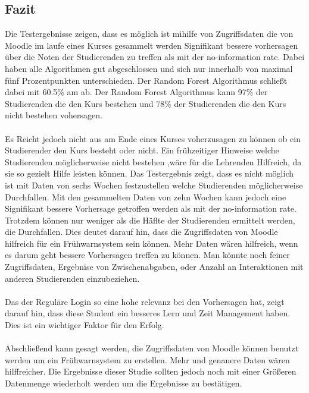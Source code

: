 \subsection{Fazit}
Die Testergebnisse zeigen, dass es möglich ist mihilfe von Zugriffsdaten die von Moodle im laufe eines Kurses gesammelt werden Signifikant bessere vorhersagen über die Noten der Studierenden zu treffen als mit der \glqq no-information rate\grqq{}.
Dabei haben alle Algorithmen gut abgeschlossen und sich nur innerhalb von maximal fünf Prozentpunkten unterschieden. Der Random Forest Algorithmus schließt dabei mit 60.5\% am ab.
Der Random Forest Algorithmus kann 97\% der Studierenden die den Kurs bestehen und 78\% der Studierenden die den Kurs nicht bestehen vohersagen.
\\ \noindent \\ \noindent
Es Reicht jedoch nicht aus am Ende eines Kurses voherzusagen zu können ob ein Studierender den Kurs besteht oder nicht.
Ein frühzeitiger Hinweise welche Studierenden möglicherweise nicht bestehen ,wäre für die Lehrenden Hilfreich, da sie so gezielt Hilfe leisten können.
Das Testergebnis zeigt, dass es nicht möglich ist mit Daten von sechs Wochen festzustellen welche Studierenden möglicherweise Durchfallen. 
Mit den gesammelten Daten von zehn Wochen kann jedoch eine Signifikant bessere Vorhersage getroffen werden als mit der \glqq no-information rate\grqq{}.
Trotzdem können nur weniger als die Häflte der Studierenden ermittelt werden, die Durchfallen. Dies deutet darauf hin, dass die Zugriffsdaten von Moodle hilfreich für ein Frühwarnsystem sein können.
Mehr Daten wären hilfreich, wenn es darum geht bessere Vorhersagen treffen zu können. Man könnte noch feiner Zugriffsdaten, Ergebnise von Zwischenabgaben, oder Anzahl an Interaktionen mit anderen Studierenden einzubeziehen.
\\ \noindent \\ \noindent
Das der Reguläre Login so eine hohe relevanz bei den Vorhersagen hat, zeigt darauf hin, dass diese Student ein besseres Lern und Zeit Management haben. Dies ist ein wichtiger Faktor für den Erfolg.
\\ \noindent \\ \noindent
Abschließend kann gesagt werden, die Zugriffsdaten von Moodle können benutzt werden um ein Frühwarnsystem zu erstellen. Mehr und genauere Daten wären hilffreicher.
Die Ergebnisse dieser Studie sollten jedoch noch mit einer Größeren Datenmenge wiederholt werden um die Ergebnisse zu bestätigen.

